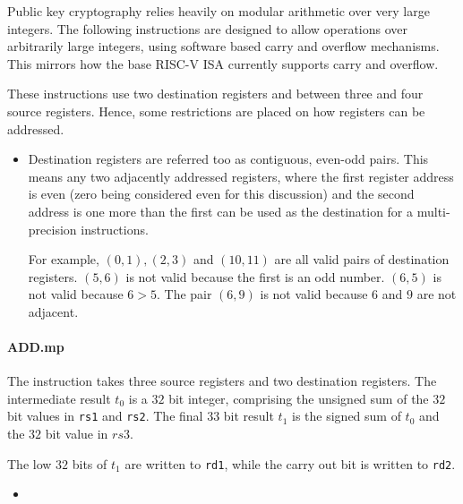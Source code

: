 Public key cryptography relies heavily on modular arithmetic over very
large integers. The following instructions are designed to allow
operations over arbitrarily large integers, using software based carry
and overflow mechanisms. This mirrors how the base RISC-V ISA currently
supports carry and overflow.

These instructions use two destination registers and between three
and four source registers. Hence, some restrictions are placed on how
registers can be addressed.

\begin{itemize}
\item Destination registers are referred too as contiguous, even-odd
pairs. This means any two adjacently addressed registers, where the
first register address is even (zero being considered even for this
discussion) and the second address is one more than the first can be
used as the destination for a multi-precision instructions. 

For example, $(0,1), (2,3)$ and $(10,11)$ are all valid
pairs of destination registers. $(5,6)$ is not valid because the first
is an odd number. $(6,5)$ is not valid because $6 > 5$. The pair $(6,9)$
is not valid because $6$ and $9$ are not adjacent.
\end{itemize}

\paragraph{ADD.mp}

The  instruction takes three source registers and two
destination registers. The intermediate result $t_0$ is a $32$
bit integer, comprising the unsigned sum of the $32$ bit values in
{\tt rs1} and {\tt rs2}. The final $33$ bit result $t_1$ is the signed
sum of $t_0$ and the $32$ bit value in $rs3$.

The low $32$ bits of $t_1$ are written to {\tt rd1}, while the carry out
bit is written to {\tt rd2}.

\begin{itemize}
\item {}
\end{itemize}

